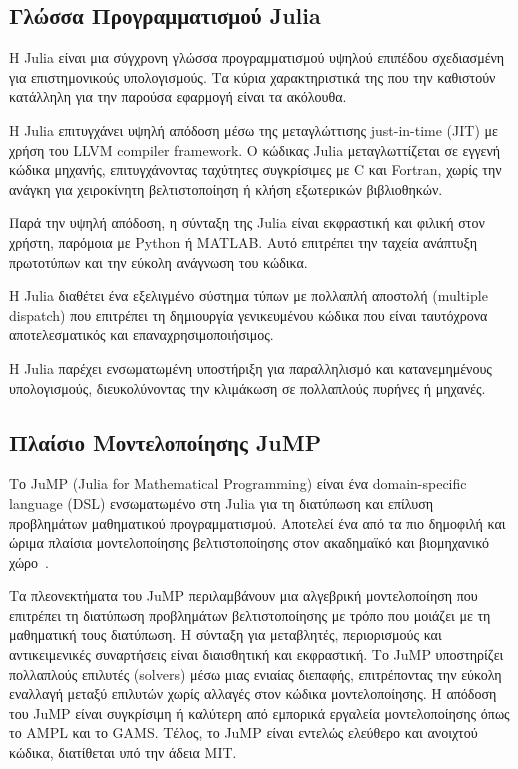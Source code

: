 \subsection{Γλώσσα Προγραμματισμού Julia}
\label{subsec:julia-language}

Η Julia είναι μια σύγχρονη γλώσσα προγραμματισμού υψηλού επιπέδου σχεδιασμένη για επιστημονικούς υπολογισμούς. Τα κύρια χαρακτηριστικά της που την καθιστούν κατάλληλη για την παρούσα εφαρμογή είναι τα ακόλουθα.

Η Julia επιτυγχάνει υψηλή απόδοση μέσω της μεταγλώττισης just-in-time (JIT) με χρήση του LLVM compiler framework. Ο κώδικας Julia μεταγλωττίζεται σε εγγενή κώδικα μηχανής, επιτυγχάνοντας ταχύτητες συγκρίσιμες με C και Fortran, χωρίς την ανάγκη για χειροκίνητη βελτιστοποίηση ή κλήση εξωτερικών βιβλιοθηκών.

Παρά την υψηλή απόδοση, η σύνταξη της Julia είναι εκφραστική και φιλική στον χρήστη, παρόμοια με Python ή MATLAB. Αυτό επιτρέπει την ταχεία ανάπτυξη πρωτοτύπων και την εύκολη ανάγνωση του κώδικα.

Η Julia διαθέτει ένα εξελιγμένο σύστημα τύπων με πολλαπλή αποστολή (multiple dispatch) που επιτρέπει τη δημιουργία γενικευμένου κώδικα που είναι ταυτόχρονα αποτελεσματικός και επαναχρησιμοποιήσιμος.

Η Julia παρέχει ενσωματωμένη υποστήριξη για παραλληλισμό και κατανεμημένους υπολογισμούς, διευκολύνοντας την κλιμάκωση σε πολλαπλούς πυρήνες ή μηχανές.

\subsection{Πλαίσιο Μοντελοποίησης JuMP}
\label{subsec:jump-framework}

Το JuMP (Julia for Mathematical Programming) είναι ένα domain-specific language (DSL) ενσωματωμένο στη Julia για τη διατύπωση και επίλυση προβλημάτων μαθηματικού προγραμματισμού. Αποτελεί ένα από τα πιο δημοφιλή και ώριμα πλαίσια μοντελοποίησης βελτιστοποίησης στον ακαδημαϊκό και βιομηχανικό χώρο~\cite{jump2017}.

Τα πλεονεκτήματα του JuMP περιλαμβάνουν μια αλγεβρική μοντελοποίηση που επιτρέπει τη διατύπωση προβλημάτων βελτιστοποίησης με τρόπο που μοιάζει με τη μαθηματική τους διατύπωση. Η σύνταξη για μεταβλητές, περιορισμούς και αντικειμενικές συναρτήσεις είναι διαισθητική και εκφραστική. Το JuMP υποστηρίζει πολλαπλούς επιλυτές (solvers) μέσω μιας ενιαίας διεπαφής, επιτρέποντας την εύκολη εναλλαγή μεταξύ επιλυτών χωρίς αλλαγές στον κώδικα μοντελοποίησης. Η απόδοση του JuMP είναι συγκρίσιμη ή καλύτερη από εμπορικά εργαλεία μοντελοποίησης όπως το AMPL και το GAMS. Τέλος, το JuMP είναι εντελώς ελεύθερο και ανοιχτού κώδικα, διατίθεται υπό την άδεια MIT.

